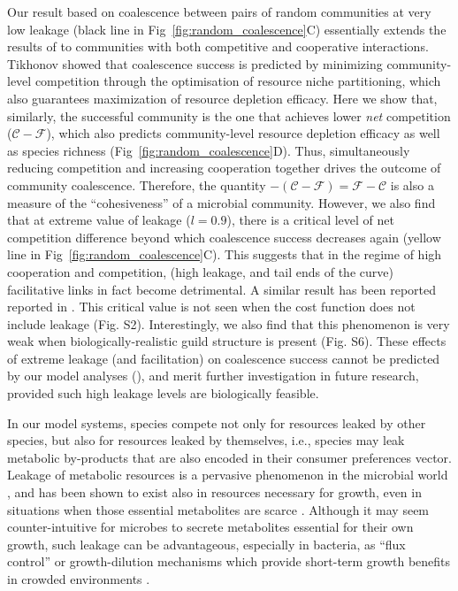 \documentclass[10pt,letterpaper]{article}
\begin{document}
Our result based on coalescence between pairs of random communities at very low leakage (black line in Fig~\ref{fig:random_coalescence}C) essentially extends the results of \cite{Tikhonov2016} to communities with both competitive and cooperative interactions. Tikhonov showed that coalescence success is predicted by minimizing community-level competition through the optimisation of resource niche partitioning, which also guarantees maximization of resource depletion efficacy. Here we show that, similarly, the successful community is the one that achieves lower {\it net} competition ($\mathcal{C}-\mathcal{F}$), which also predicts community-level resource depletion efficacy as well as species richness (Fig~\ref{fig:random_coalescence}D). Thus, simultaneously reducing competition and increasing cooperation together drives the outcome of community coalescence. Therefore, the quantity $-(\mathcal{C}-\mathcal{F}) = \mathcal{F}-\mathcal{C}$ is also a measure of the ``cohesiveness'' of a microbial community. However, we also find that at extreme value of leakage ($l = 0.9$), there is a critical level of net competition difference beyond which coalescence success decreases again (yellow line in
Fig~\ref{fig:random_coalescence}C). This suggests that in the regime of high cooperation and competition, (high leakage, and tail ends of the curve) facilitative links in fact become detrimental. A similar result has been reported reported in \cite{Pascual-Garcia2017}. This critical value is not seen when the cost function does not include leakage (Fig. S2). Interestingly, we also find that this phenomenon is very weak when biologically-realistic guild structure is present (Fig. S6). These effects of extreme leakage (and facilitation) on coalescence success cannot be predicted by our model analyses (), and merit further investigation in future research, provided such high leakage levels are biologically feasible.

In our model systems, species compete not only for resources leaked by other species, but also for resources leaked by themselves, i.e., species may leak metabolic by-products that are also encoded in their consumer preferences vector. Leakage of metabolic resources is a pervasive phenomenon in the microbial world \cite{Morris2015, Kallus2017}, and has been shown to exist also in resources necessary for growth, even in situations when those essential metabolites are scarce \cite{Paczia2012, Silva2015}. Although it may seem counter-intuitive for microbes to secrete metabolites essential for their own growth, such leakage can be advantageous, especially in bacteria, as ``flux control'' or growth-dilution mechanisms which provide short-term growth benefits in crowded environments \cite{Yamagishi2020,Yamagishi2021}.
\end{document}
